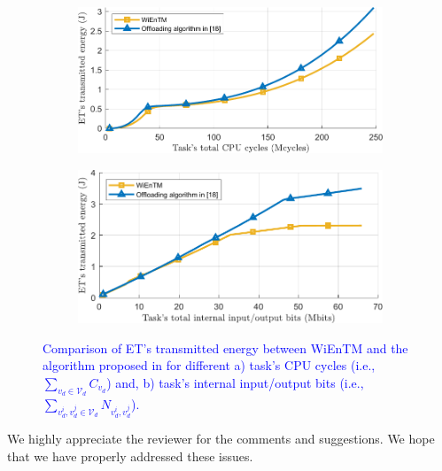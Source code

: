 \documentclass[12pt,draftclsnofoot,onecolumn]{IEEEtran}
\newenvironment{my}[2]%
{\begin{list}{}%
{\setlength{\rightmargin}{#1}\setlength{\leftmargin}{#2}}%


 \item[]{}

} {\end{list}}
\begin{document}
\begin{enumerate}
\begin{my}{1cm}{1cm}
\end{my}

\setcounter{figure}{7}
\begin{figure}
	\centering
	\begin{subfigure}[b]{.43\textwidth}
		\centering
		\includegraphics[width=\linewidth]{simulation2_a.pdf}
		\caption{} \label{fig:7ar}
	\end{subfigure}
	\begin{subfigure}[b]{.43\textwidth}
		\centering
		\includegraphics[width=\linewidth]{simulation2_b.pdf}
		\caption{} \label{fig:7br}
	\end{subfigure}
	
	\caption{\textcolor{blue}{Comparison of ET's transmitted energy between WiEnTM and the algorithm proposed in \cite{b13} for different a) task's CPU cycles (i.e., $\sum_{v_d\in\mathcal{V}_d}C_{v_d}$) and, b) task's internal input/output bits (i.e., $\sum_{v_d^i,v_d^j\in\mathcal{V}_d}N_{v_d^i,v_d^j}$).}} \label{fig:7r}
\end{figure}


\end{enumerate}

We highly appreciate the reviewer for the comments and suggestions. We hope that we have properly addressed these issues.
\end{document}

